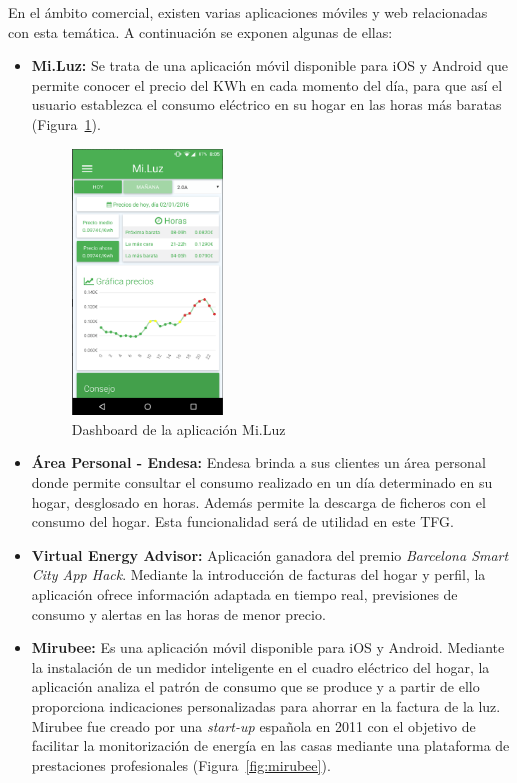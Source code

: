 En el ámbito comercial, existen varias aplicaciones móviles y web relacionadas con esta temática. A continuación se exponen algunas de ellas:
\begin{itemize}
  \item \textbf{Mi.Luz:} Se trata de una aplicación móvil disponible para iOS y Android que permite conocer el precio del KWh en cada momento del día, para que así el usuario establezca el consumo eléctrico en su hogar en las horas más baratas (Figura~\ref{fig:miluz}).
    \begin{figure}[!h]
	\centering
	\includegraphics[width=4cm]{figs/miluz.png}
	\caption{Dashboard de la aplicación Mi.Luz}
        \label{fig:miluz}
\end{figure}
\item \textbf{Área Personal - Endesa:} Endesa brinda a sus clientes un área personal donde permite consultar el consumo realizado en un día determinado en su hogar, desglosado en horas. Además permite la descarga de ficheros con el consumo del hogar. Esta funcionalidad será de utilidad en este \gls{TFG}.
\item \textbf{Virtual Energy Advisor:} Aplicación ganadora del premio \textit{Barcelona Smart City App Hack}. Mediante la introducción de facturas del hogar y perfil, la aplicación ofrece información adaptada en tiempo real, previsiones de consumo y alertas en las horas de menor precio.
\item \textbf{Mirubee:} Es una aplicación móvil disponible para iOS y Android. Mediante la instalación de un medidor inteligente en el cuadro eléctrico del hogar, la aplicación analiza el patrón de consumo que se produce y a partir de ello proporciona indicaciones personalizadas para ahorrar en la factura de la luz. Mirubee fue creado por una \textit{start-up} española en 2011 con el objetivo de facilitar la monitorización de energía en las casas mediante una plataforma de prestaciones profesionales (Figura~\ref{fig:mirubee}).

\end{itemize}
